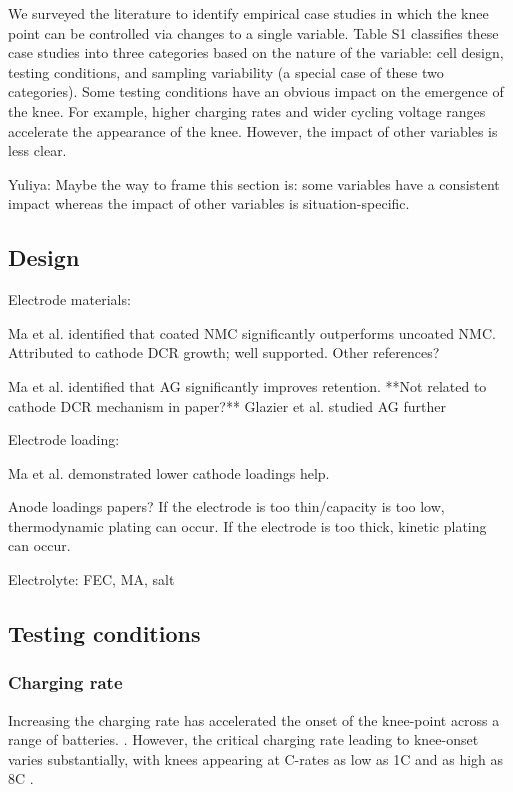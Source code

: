 \documentclass{article}
\begin{document}
We surveyed the literature to identify empirical case studies in which the knee point can be controlled via changes to a single variable. Table S1 classifies these case studies into three categories based on the nature of the variable: cell design, testing conditions, and sampling variability (a special case of these two categories). Some testing conditions have an obvious impact on the emergence of the knee. For example, higher charging rates and wider cycling voltage ranges accelerate the appearance of the knee. However, the impact of other variables is less clear. 

Yuliya: Maybe the way to frame this section is: some variables have a consistent impact whereas the impact of other variables is situation-specific.

\subsection{Design}

Electrode materials:

Ma et al.\cite{ma_editors_2019} identified that coated NMC significantly outperforms uncoated NMC.
Attributed to cathode DCR growth; well supported.
Other references?

Ma et al.\cite{ma_editors_2019} identified that AG significantly improves retention.
**Not related to cathode DCR mechanism in paper?**
Glazier et al. studied AG further


Electrode loading:

Ma et al.\cite{ma_editors_2019} demonstrated lower cathode loadings help.

Anode loadings papers?
If the electrode is too thin/capacity is too low, thermodynamic plating can occur.
If the electrode is too thick, kinetic plating can occur.


Electrolyte: FEC, MA, salt


\subsection{Testing conditions}

\subsubsection{Charging rate}
Increasing the charging rate has accelerated the onset of the knee-point across a range of batteries. \cite{lewerenz_systematic_2017,lewerenz_post-mortem_2017, petzl_lithium_2015, burns_-situ_2015, waldmann_optimization_2015, schuster_nonlinear_2015, severson_data-driven_2019, schindler_fast_2018, keil_linear_2019}. However, the critical charging rate leading to knee-onset varies substantially, with knees appearing at C-rates as low as 1C \cite{waldmann_optimization_2015} and as high as 8C \cite{lewerenz_systematic_2017}. 
\end{document}
